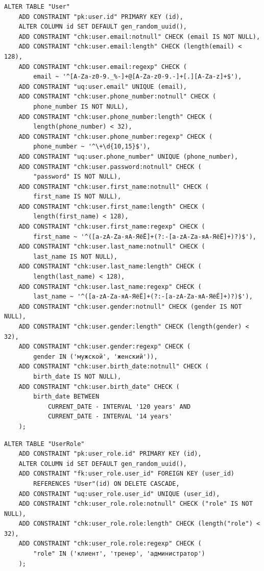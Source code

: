 \begin{lstlisting}[label=alg:14, caption=Реализация  ограничений целостности данных отношения User, captionpos=t]
ALTER TABLE "User"
	ADD CONSTRAINT "pk:user.id" PRIMARY KEY (id),
	ALTER COLUMN id SET DEFAULT gen_random_uuid(),
	ADD CONSTRAINT "chk:user.email:notnull" CHECK (email IS NOT NULL),
	ADD CONSTRAINT "chk:user.email:length" CHECK (length(email) < 128),
	ADD CONSTRAINT "chk:user.email:regexp" CHECK (
		email ~ '^[A-Za-z0-9._%-]+@[A-Za-z0-9.-]+[.][A-Za-z]+$'),
	ADD CONSTRAINT "uq:user.email" UNIQUE (email),
	ADD CONSTRAINT "chk:user.phone_number:notnull" CHECK (
		phone_number IS NOT NULL),
	ADD CONSTRAINT "chk:user.phone_number:length" CHECK (
		length(phone_number) < 32),
	ADD CONSTRAINT "chk:user.phone_number:regexp" CHECK (
		phone_number ~ '^\+\d{10,15}$'),
	ADD CONSTRAINT "uq:user.phone_number" UNIQUE (phone_number),
	ADD CONSTRAINT "chk:user.password:notnull" CHECK (
		"password" IS NOT NULL),
	ADD CONSTRAINT "chk:user.first_name:notnull" CHECK (
		first_name IS NOT NULL),
	ADD CONSTRAINT "chk:user.first_name:length" CHECK (
		length(first_name) < 128),
	ADD CONSTRAINT "chk:user.first_name:regexp" CHECK (
		first_name ~ '^([a-zA-Zа-яА-ЯёЁ]+(?:-[a-zA-Zа-яА-ЯёЁ]+)?)$'),
	ADD CONSTRAINT "chk:user.last_name:notnull" CHECK (
		last_name IS NOT NULL),
	ADD CONSTRAINT "chk:user.last_name:length" CHECK (
		length(last_name) < 128),
	ADD CONSTRAINT "chk:user.last_name:regexp" CHECK (
		last_name ~ '^([a-zA-Zа-яА-ЯёЁ]+(?:-[a-zA-Zа-яА-ЯёЁ]+)?)$'),
	ADD CONSTRAINT "chk:user.gender:notnull" CHECK (gender IS NOT NULL),
	ADD CONSTRAINT "chk:user.gender:length" CHECK (length(gender) < 32),
	ADD CONSTRAINT "chk:user.gender:regexp" CHECK (
		gender IN ('мужской', 'женский')),
	ADD CONSTRAINT "chk:user.birth_date:notnull" CHECK (
		birth_date IS NOT NULL),
	ADD CONSTRAINT "chk:user.birth_date" CHECK (
		birth_date BETWEEN 
			CURRENT_DATE - INTERVAL '120 years' AND 
			CURRENT_DATE - INTERVAL '14 years'
	);
\end{lstlisting}

\begin{lstlisting}[label=alg:15, caption=Реализация  ограничений целостности данных отношения UserRole, captionpos=t]
ALTER TABLE "UserRole"
	ADD CONSTRAINT "pk:user_role.id" PRIMARY KEY (id),
	ALTER COLUMN id SET DEFAULT gen_random_uuid(),
	ADD CONSTRAINT "fk:user_role.user_id" FOREIGN KEY (user_id) 
		REFERENCES "User"(id) ON DELETE CASCADE,
	ADD CONSTRAINT "uq:user_role.user_id" UNIQUE (user_id),
	ADD CONSTRAINT "chk:user_role.role:notnull" CHECK ("role" IS NOT NULL),
	ADD CONSTRAINT "chk:user_role.role:length" CHECK (length("role") < 32),
	ADD CONSTRAINT "chk:user_role.role:regexp" CHECK (
		"role" IN ('клиент', 'тренер', 'администратор')
	);
\end{lstlisting}

